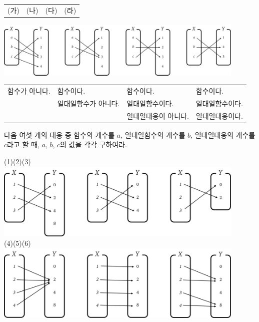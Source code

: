 \documentclass{oblivoir}
\begin{document}
\newpage
\begin{center}
\begin{tabu}{X[c]X[c]X[c]X[c]}
(가)				&(나)				&(다)				&(라)\\
\end{tabu}
\includegraphics[width=0.9\textwidth]{various_0}\par
\begin{tabu}{>{\scriptsize}X[c]>{\scriptsize}X[c]>{\scriptsize}X[c]>{\scriptsize}X[c]}
함수가 아니다. 	&함수이다. 			&함수이다.			&함수이다.\\
				&일대일함수가 아니다.	&일대일함수이다.		&일대일함수이다.\\
				&					&일대일대응이 아니다.	&일대일대응이다.
\end{tabu}
\end{center}


%
\prob{}\label{various3}
다음 여섯 개의 대응 중 함수의 개수를 \(a\), 일대일함수의 개수를 \(b\),  일대일대응의 개수를 \(c\)라고 할 때, \(a\), \(b\), \(c\)의 값을 각각 구하여라.
\begin{center}
(1)\hspace{100pt}(2)\hspace{100pt}(3)\\
\includegraphics[width=0.9\textwidth]{various_3-1}\\[10pt]
(4)\hspace{100pt}(5)\hspace{100pt}(6)\\
\includegraphics[width=0.9\textwidth]{various_3-2}
\end{center}
\end{document}
